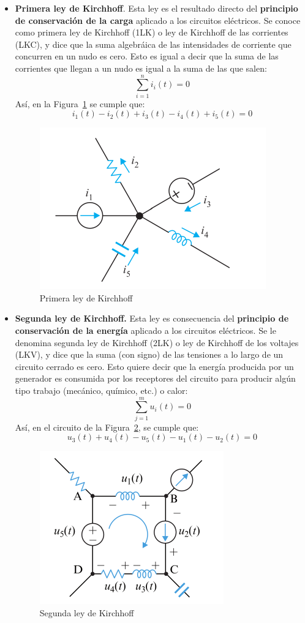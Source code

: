 \documentclass[11pt]{book} %
\begin{document}
	\begin{itemize}
		\item \textbf{Primera ley de Kirchhoff}. Esta ley es el resultado directo del \textbf{principio de conservación de la carga} aplicado a los circuitos eléctricos. Se conoce como primera ley de Kirchhoff (1LK) o ley de Kirchhoff de las corrientes (LKC), y dice que la suma algebráica de las intensidades de corriente que concurren en un nudo es cero. Esto es igual a decir que la suma de las corrientes que llegan a un nudo es igual a la suma de las que salen: 
		\begin{equation}
			\boxed{\sum_{i=1}^n i_i(t)=0}
		\end{equation}
		Así, en la Figura~\ref{fig.LKC_FM} se cumple que:
		\begin{equation*}
			i_1(t) - i_2(t) + i_3(t) - i_4(t) + i_5(t) = 0
		\end{equation*}
		
		\begin{figure}[htbp]
			\centering
			\includegraphics[width=0.35\linewidth]{../figs/LKC_FM.pdf}
			\caption{Primera ley de Kirchhoff}
			\label{fig.LKC_FM}
		\end{figure}
		\item \textbf{Segunda ley de Kirchhoff.} Esta ley es consecuencia del \textbf{principio de conservación de la energía} aplicado a los circuitos eléctricos. Se le
		denomina segunda ley de Kirchhoff (2LK) o ley de Kirchhoff de los voltajes (LKV), y dice que la suma (con signo) de las tensiones a lo largo de un circuito cerrado es cero. Esto quiere decir que la energía producida por un generador es consumida por los receptores del circuito
		para producir algún tipo trabajo (mecánico, químico, etc.) o calor:
		\begin{equation}
			\boxed{\sum_{j=1}^m u_i(t)=0}
		\end{equation}
		Así, en el circuito de la Figura~\ref{fig.LKV_FM}, se cumple que:
		\begin{equation*}
			u_3(t) + u_4 (t) - u_5 (t) - u_1 (t) - u_2 (t)  = 0 
		\end{equation*}
		\begin{figure}[htbp]
			\centering
			\includegraphics[width=0.35\linewidth]{../figs/LKV_FM.pdf}
			\caption{Segunda ley de Kirchhoff}
			\label{fig.LKV_FM}
		\end{figure}
	\end{itemize}
	
\end{document}
